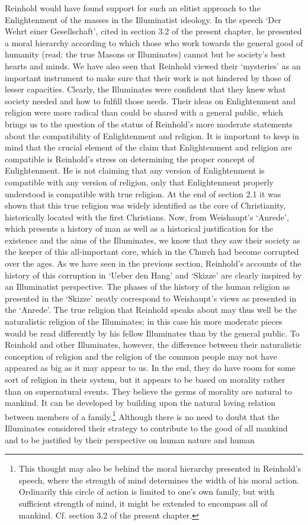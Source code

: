  Reinhold would have found support for such an elitist approach to the Enlightenment of the masses in the Illuminatist ideology. In the speech `Der Wehrt einer Gesellschaft', cited in section 3.2 of the present chapter, he presented a moral hierarchy according to which those who work towards the general good of humanity (read: the true Masons or Illuminates) cannot but be society's best hearts and minds. We have also seen that Reinhold viewed their `mysteries' as an important instrument to make sure that their work is not hindered by those of lesser capacities. Clearly, the Illuminates were confident that they knew what society needed and how to fulfill those needs. Their ideas on Enlightenment and religion were more radical than could be shared with a general public, which brings us to the question of the status of Reinhold's more moderate statements about the compatibility of Enlightenment and religion. It is important to keep in mind that the crucial element of the claim that Enlightenment and religion are compatible is Reinhold's stress on determining the proper concept of Enlightenment. He is not claiming that any version of Enlightenment is compatible with any version of religion, only that Enlightenment properly understood is compatible with true religion. At the end of section 2.1 it was shown that this true religion was widely identified as the core of Christianity, historically located with the first Christians. Now, from Weishaupt's `Anrede', which presents a history of man as well as a historical justification for the existence and the aims of the Illuminates, we know that they saw their society as the keeper of this all{-}important core, which in the Church had become corrupted over the ages. As we have seen in the previous section, Reinhold's accounts of the history of this corruption in `Ueber den Hang' and `Skizze' are clearly inspired by an Illuminatist perspective. The phases of the history of the human religion as presented in the `Skizze' neatly correspond to Weishaupt's views as presented in the `Anrede'. The true religion that Reinhold speaks about may thus well be the naturalistic religion of the Illuminates; in this case his more moderate pieces would be read differently by his fellow Illuminates than by the general public. To Reinhold and other Illuminates, however, the difference between their naturalistic conception of religion and the religion of the common people may not have appeared as big as it may appear to us. In the end, they do have room for some sort of religion in their system, but it appears to be based on morality rather than on supernatural events. They believe the germs of morality are natural to mankind. It can be developed by building upon the natural loving relation between members of a family.\footnote{ This thought may also be behind the moral hierarchy presented in Reinhold's speech, where the strength of mind determines the width of his moral action. Ordinarily this circle of action is limited to one's own family, but with sufficient strength of mind, it might be extended to encompass all of mankind. Cf. section 3.2 of the present chapter.} Although there is no need to doubt that the Illuminates considered their strategy to contribute to the good of all mankind and to be justified by their perspective on human nature and human 
